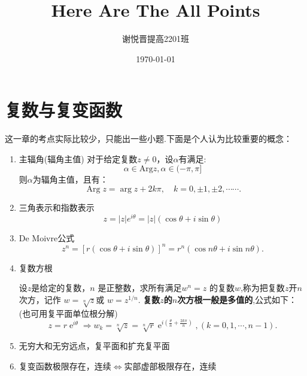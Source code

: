\documentclass[a4paper,11pt,UTF8]{article}
\title{Here Are The All Points}
\author{谢悦晋\quad 提高2201班}
\date{\today}
\begin{document}
\maketitle
\tableofcontents\newpage
\section{复数与复变函数}
这一章的考点实际比较少，只能出一些小题.下面是个人认为比较重要的概念：
\begin{enumerate}
	\item 主辐角(辐角主值)
	对于给定复数$z\neq0$，设$\alpha$有满足:
	$$\alpha\in\mathrm{Arg}z,\alpha\in(-\pi,\pi]$$
	则$\alpha$为辐角主值，且有：
	$$\operatorname{Arg}z=\operatorname{arg}z+2k\pi,\quad k=0,\pm1,\pm2,\cdots\cdots.$$
	\item 三角表示和指数表示
	$$z=|z|e^{i\theta}=|z|(\cos\theta+i\sin\theta)$$
	\item De Moivre公式
	$$z^n=[r(\cos\theta+i\sin\theta)]^n=r^n(\cos n\theta+i\sin n\theta).$$
	\item 复数方根
	
	设$z$是给定的复数，$n$ 是正整数，求所有满足$w^n=z$ 的复数$w$,称为把复数$z$开$n$ 次方，记作 $w=\sqrt[n]{z}$或 $w=z^{1/n}.$ \textbf{复数$z$的$n$次方根一般是多值的},公式如下：(也可用复平面单位根分解)
	$$z=r\operatorname{e}^{i\theta}\Rightarrow w_k=\sqrt[n]{z}=\sqrt[n]{r}\operatorname{e}^{i(\frac\theta n+\frac{2k\pi}n)},(k=0,1,\cdots,n-1).$$
	\item 无穷大和无穷远点，复平面和扩充复平面
	\item 复变函数极限存在，连续$\Leftrightarrow$实部虚部极限存在，连续
\end{enumerate}
\end{document}
